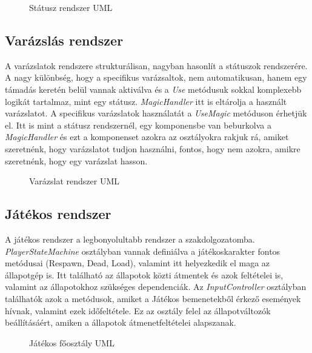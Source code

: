 \begin{figure}[H]
	\noindent{}
	\caption{Státusz rendszer UML}
	\label{StatusSystem}
\end{figure}

\subsection{Varázslás rendszer}
A varázslatok rendszere strukturálisan, nagyban hasonlít a státuszok rendszerére. A nagy különbség, hogy a specifikus varázsaltok, nem automatikusan, hanem egy támadás keretén belül vannak aktiválva és a \textit{Use} metódusuk sokkal komplexebb logikát tartalmaz, mint egy státusz. \textit{MagicHandler} itt is eltárolja a használt varázslatot. A specifikus varázslatok használatát a \textit{UseMagic} metóduson érhetjük el. Itt is mint a státusz rendszernél, egy komponensbe van beburkolva a \textit{MagicHandler} és ezt a komponenset azokra az osztályokra rakjuk rá, amiket szeretnénk, hogy varázslatot tudjon használni, fontos, hogy nem azokra, amikre szeretnénk, hogy egy varázslat hasson.

\begin{figure}[H]
	\noindent{}
	\caption{Varázslat rendszer UML}
	\label{MagicSystem}
\end{figure}

\subsection{Játékos rendszer}
A játékos rendszer a legbonyolultabb rendszer a szakdolgozatomba. \textit{PlayerStateMachine} osztályban vannak definiálva a játékoskarakter fontos metódusai (Respawn, Dead, Load), valamint itt helyezkedik el maga az állapotgép is. Itt található az állapotok közti átmentek és azok feltételei is, valamint az állapotokhoz szükséges dependenciák. Az \textit{InputController} osztályban találhatók azok a metódusok, amiket a Játékos bemenetekből érkező események hívnak, valamint ezek időfeltétele. Ez az osztály felel az állapotváltozók beállításáért, amiken a állapotok átmenetfeltételei alapszanak.

\begin{figure}[H]
	\noindent{}
	\caption{Játékos főosztály UML}
	\label{PlayerSystem1}
\end{figure}

